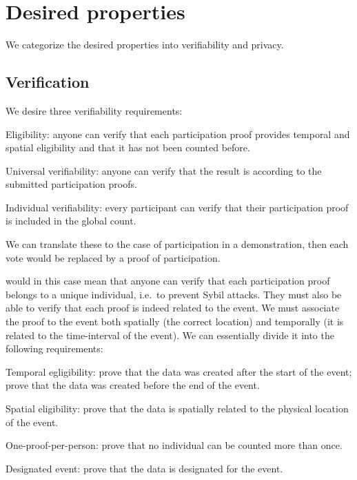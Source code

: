 \mode*
\section{Desired properties}%
\label{Properties}

We categorize the desired properties into verifiability and privacy.

\subsection{Verification}%
\label{Verification}

We desire three verifiability requirements:
\begin{requirements}[V]
\item\label{EligibilityVerif} Eligibility: anyone can verify that each 
  participation proof provides temporal and spatial eligibility and that it has 
  not been counted before.
\item\label{UniversalVerif} Universal verifiability: anyone can verify that the 
  result is according to the submitted participation proofs.
\item\label{IndividualVerif} Individual verifiability: every participant can 
  verify that their participation proof is included in the global count.
\end{requirements}
We can translate these to the case of participation in a demonstration, then 
each vote would be replaced by a proof of participation.

 would in this case mean that anyone can verify that 
each participation proof belongs to a unique individual, i.e.\ to prevent Sybil 
attacks.
They must also be able to verify that each proof is indeed related to the 
event.
We must associate the proof to the event both spatially (the correct location) 
and temporally (it is related to the time-interval of the event).
We can essentially divide it into the following requirements:
\begin{requirements}
  \item Temporal egligibility:%
    \label{CreatedAfterStart} prove that the data was created after the start of 
    the event;%
    \label{CreatedBeforeEnd} prove that the data was created before the end of 
    the event.
  \item Spatial eligibility:%
    \label{SpatiallyRelated} prove that the data is spatially related to the 
    physical location of the event.
  \item One-proof-per-person:%
    \label{CountOnce} prove that no individual can be counted more than once.
  \item Designated event:%
    \label{DesignatedEvent} prove that the data is designated for the event.
\end{requirements}

